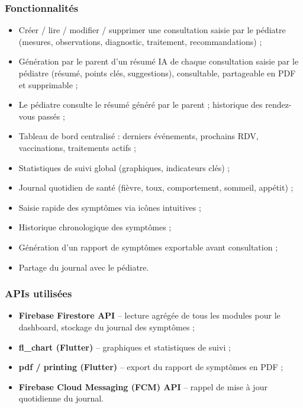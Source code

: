 \documentclass[11pt,a4paper]{article}
\begin{document}
\subsubsection*{Fonctionnalités}
\begin{itemize}
  \item Créer / lire / modifier / supprimer une consultation saisie par le pédiatre (mesures, observations, diagnostic, traitement, recommandations) ;
  \item Génération par le parent d'un résumé IA de chaque consultation saisie par le pédiatre (résumé, points clés, suggestions), consultable, partageable en PDF et supprimable ;
  \item Le pédiatre consulte le résumé généré par le parent ; historique des rendez-vous passés ;
  \item Tableau de bord centralisé : derniers événements, prochains RDV, vaccinations, traitements actifs ;
  \item Statistiques de suivi global (graphiques, indicateurs clés) ;
  \item Journal quotidien de santé (fièvre, toux, comportement, sommeil, appétit) ;
  \item Saisie rapide des symptômes via icônes intuitives ;
  \item Historique chronologique des symptômes ;
  \item Génération d'un rapport de symptômes exportable avant consultation ;
  \item Partage du journal avec le pédiatre.
\end{itemize}

\subsubsection*{APIs utilisées}
\begin{itemize}
  \item \textbf{Firebase Firestore API} -- lecture agrégée de tous les modules pour le dashboard, stockage du journal des symptômes ;
  \item \textbf{fl\_chart (Flutter)} -- graphiques et statistiques de suivi ;
  \item \textbf{pdf / printing (Flutter)} -- export du rapport de symptômes en PDF ;
  \item \textbf{Firebase Cloud Messaging (FCM) API} -- rappel de mise à jour quotidienne du journal.
\end{itemize}
\end{document}
